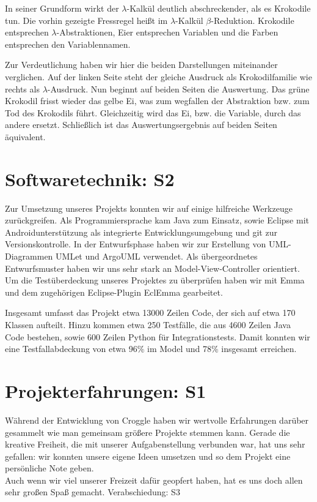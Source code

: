 \documentclass{scrartcl}
\begin{document}
	In seiner Grundform wirkt der $\lambda$-Kalkül deutlich abschreckender, als es Krokodile tun.
	Die vorhin gezeigte Fressregel heißt im $\lambda$-Kalkül $\beta$-Reduktion.
	Krokodile entsprechen $\lambda$-Abstraktionen, Eier entsprechen Variablen und die Farben entsprechen den Variablennamen.

	Zur Verdeutlichung haben wir hier die beiden Darstellungen miteinander verglichen.
	Auf der linken Seite steht der gleiche Ausdruck als Krokodilfamilie wie rechts als $\lambda$-Ausdruck.
	Nun beginnt auf beiden Seiten die Auswertung.
	Das grüne Krokodil frisst wieder das gelbe Ei, was zum wegfallen der Abstraktion bzw. zum Tod des Krokodils führt.
	Gleichzeitig wird das Ei, bzw. die Variable, durch das andere ersetzt.
	Schließlich ist das Auswertungsergebnis auf beiden Seiten äquivalent.

	\section{Softwaretechnik: S2}
	Zur Umsetzung unseres Projekts konnten wir auf einige hilfreiche Werkzeuge zurückgreifen.
	Als Programmiersprache kam Java zum Einsatz, sowie Eclipse mit Androidunterstützung als integrierte Entwicklungsumgebung und git zur Versionskontrolle.
	In der Entwurfsphase haben wir zur Erstellung von UML-Diagrammen UMLet und ArgoUML verwendet.
	Als übergeordnetes Entwurfsmuster haben wir uns sehr stark an Model-View-Controller orientiert.
	Um die Testüberdeckung unseres Projektes zu überprüfen haben wir mit Emma und dem zugehörigen Eclipse-Plugin EclEmma gearbeitet.

	Insgesamt umfasst das Projekt etwa 13000 Zeilen Code, der sich auf etwa 170 Klassen aufteilt.
	Hinzu kommen etwa 250 Testfälle, die aus 4600 Zeilen Java Code bestehen, sowie 600 Zeilen Python für Integrationstests.
	Damit konnten wir eine Testfallabdeckung von etwa 96\% im Model und 78\% insgesamt erreichen.

	\section{Projekterfahrungen: S1}

	Während der Entwicklung von Croggle haben wir wertvolle Erfahrungen darüber gesammelt wie man gemeinsam größere Projekte stemmen kann. 
	Gerade die kreative Freiheit, die mit unserer Aufgabenstellung verbunden war, hat uns sehr gefallen: wir konnten unsere eigene Ideen umsetzen und so dem Projekt eine persönliche Note geben. \\
	Auch wenn wir viel unserer Freizeit dafür geopfert haben, hat es uns doch allen sehr großen Spaß gemacht.
	Verabschiedung: S3
     
\end{document}
